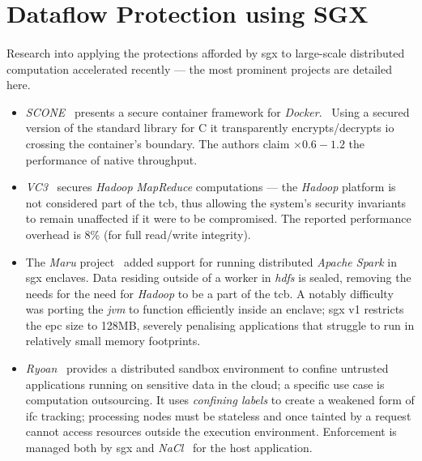 \section{Dataflow Protection using SGX}
\paragraph{} Research into applying the protections afforded by \acrshort{sgx} to large-scale distributed computation accelerated recently --- the most prominent projects are detailed here. 

\begin{itemize}
    \item \textit{SCONE}~\cite{10.5555/3026877.3026930} presents a secure container framework for \textit{Docker}.~\cite{docker-security} Using a secured version of the standard library for C it transparently encrypts/decrypts \acrshort{io} crossing the container's boundary. The authors claim $\times 0.6-1.2$ the performance of native throughput.
    \item \textit{VC3}~\cite{vc37163017} secures \textit{Hadoop} \textit{MapReduce} computations --- the \textit{Hadoop} platform is not considered part of the \acrshort{tcb}, thus allowing the system's security invariants to remain unaffected if it were to be compromised. The reported performance overhead is 8\% (for full read/write integrity).
    \item The \textit{Maru} project~\cite{maru} added support for running distributed \textit{Apache Spark} in \acrshort{sgx} enclaves. Data residing outside of a worker in \textit{\acrshort{hdfs}} is sealed, removing the needs for the need for \textit{Hadoop} to be a part of the \acrshort{tcb}. A notably difficulty was porting the \textit{\acrshort{jvm}} to function efficiently inside an enclave; \acrshort{sgx} v1 restricts the \acrshort{epc} size to 128MB, severely penalising applications that struggle to run in relatively small memory footprints.
    \item \textit{Ryoan}~\cite{ryoan199358} provides a distributed sandbox environment to confine untrusted applications running on sensitive data in the cloud; a specific use case is computation outsourcing. It uses \textit{confining labels} to create a weakened form of \acrshort{ifc} tracking; processing nodes must be stateless and once tainted by a request cannot access resources outside the execution environment. Enforcement is managed both by \acrshort{sgx} and \textit{NaCl}~\cite{nacl} for the host application. 
\end{itemize}

